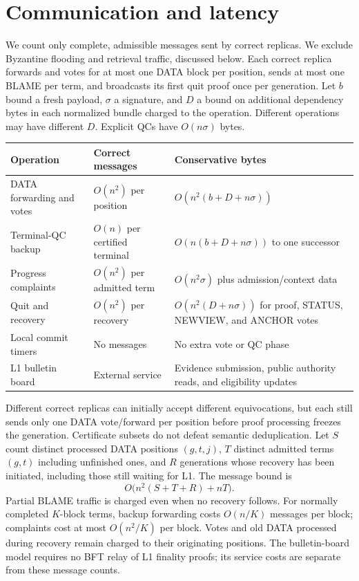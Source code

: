 \documentclass[11pt,a4paper]{article}
\begin{document}
\section{Communication and latency}
\label{sec:complexity}
We count only complete, admissible messages sent by correct replicas.
We exclude Byzantine flooding and retrieval traffic, discussed
below.
Each correct replica forwards and votes for at most one DATA
block per position, sends at most one BLAME  per term, and
broadcasts its first quit proof once per generation. Let $b$ bound a fresh
payload, $\sigma$ a signature, and $D$ a bound on additional
dependency bytes in each normalized bundle charged to the operation.
Different operations may have different $D$. Explicit QCs have
$O(n\sigma)$ bytes.

\begin{center}\small
\begin{tabularx}{\linewidth}{@{}>{\raggedright\arraybackslash}p{.24\linewidth}
 >{\raggedright\arraybackslash}p{.20\linewidth}Y@{}}
\toprule
Operation & Correct messages & Conservative bytes\\
\midrule
DATA forwarding and votes & $O(n^2)$ per position &
$O(n^2(b+D+n\sigma))$\\
Terminal-QC backup & $O(n)$ per certified terminal &
$O(n(b+D+n\sigma))$ to one successor\\
Progress complaints & $O(n^2)$ per admitted term &
$O(n^2\sigma)$ plus admission/context data\\
Quit and recovery & $O(n^2)$ per recovery &
$O(n^2(D+n\sigma))$ for proof, STATUS, NEWVIEW, and ANCHOR votes\\
Local commit timers & No messages & No extra vote or QC phase\\
L1 bulletin board & External service & Evidence submission, public authority
reads, and eligibility updates\\
\bottomrule
\end{tabularx}
\end{center}
Different correct replicas can initially accept different
equivocations, but each still sends only one DATA vote/forward per position
before proof processing freezes the generation. Certificate subsets do not
defeat semantic deduplication. Let $S$ count distinct processed DATA
positions $(g,t,j)$, $T$ distinct admitted terms $(g,t)$ including
unfinished ones, and $R$ generations whose recovery has been initiated,
including those still waiting for L1. The message bound is
\[
 O\bigl(n^2(S+T+R)+nT\bigr).
\]
Partial BLAME traffic is charged even when no recovery follows. For
normally completed $K$-block terms, backup forwarding costs $O(n/K)$
messages per block; complaints cost at most $O(n^2/K)$ per block.
Votes and old DATA processed during recovery remain charged to their
originating positions. The bulletin-board model requires no BFT relay of
L1 finality proofs; its service costs are separate from these message counts.
\end{document}
